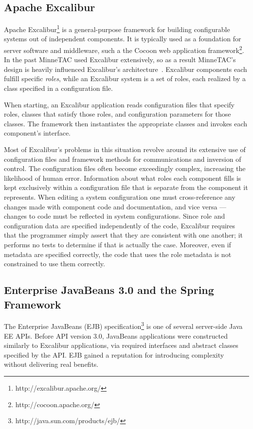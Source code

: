 \documentclass{article}
\begin{document}
\subsection{Apache Excalibur}

Apache Excalibur\footnote{http://excalibur.apache.org/} is a general-purpose framework for building configurable systems out of independent components.
It is typically used as a foundation for server software and middleware, such a the Cocoon web application framework\footnote{http://cocoon.apache.org/}.
In the past MinneTAC used Excalibur extensively, so as a result MinneTAC's design is heavily influenced Excalibur's architecture~\cite{Collins08ECRA}.
Excalibur components each fulfill specific \emph{roles}, while an Excalibur system is a set of roles, each realized by a class specified in a configuration file.

When starting, an Excalibur application reads configuration files that
specify roles, classes that satisfy those roles, and configuration
parameters for those classes.  The framework then instantiates the
appropriate classes and invokes each component's interface.

Most of Excalibur's problems in this situation revolve around
its extensive use of configuration files and framework methods for
communications and inversion of control.  The configuration files often become exceedingly complex, increasing the likelihood of human error.
Information about what roles
each component fills is kept exclusively within a configuration file that
is separate from the component it represents.  When editing a system
configuration one must cross-reference any changes made with component
code and documentation, and vice versa --- changes to code must be
reflected in system configurations.  Since role and configuration data
are specified independently of the code, Excalibur requires that the
programmer simply assert that they are consistent with one another;
it performs no tests to determine if that is actually the case.  Moreover,
even if metadata are specified correctly, the code that uses the role metadata is not constrained to use them correctly.

\subsection{Enterprise JavaBeans 3.0 and the Spring Framework}

The Enterprise JavaBeans (EJB) specification\footnote{http://java.sun.com/products/ejb/} is one of several server-side Java EE APIs.
Before API version 3.0, JavaBeans applications were constructed similarly to Excalibur applications, via required interfaces and abstract classes specified by the API.
EJB gained a reputation for introducing complexity without delivering real benefits.
\end{document}

